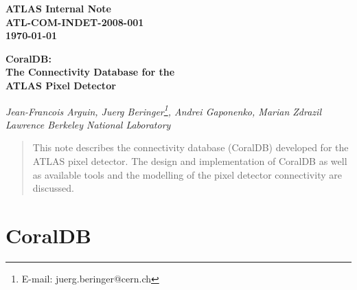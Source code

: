 \documentclass[12pt,twoside]{article}
\begin{document}
%
%
\begin{flushright} \large \bf
ATLAS Internal Note\\
ATL-COM-INDET-2008-001\\
\today
\end{flushright}

\vspace*{2cm}
\begin{center} \LARGE \bf
CoralDB:\\The Connectivity Database for the\\ATLAS Pixel Detector
\end{center}

\vspace*{0.2cm}
\begin{center} \it
Jean-Francois Arguin, Juerg Beringer\footnote{E-mail: juerg.beringer@cern.ch}, Andrei Gaponenko, Marian Zdrazil\\
Lawrence Berkeley National Laboratory\\
\vspace*{0.5cm}
\end{center}

\vspace*{0.5cm}
\begin{abstract} \noindent
This note describes the connectivity database (CoralDB) developed for the ATLAS pixel
detector. The design and implementation of CoralDB as well as available tools and the modelling
of the pixel detector connectivity are discussed.
\end{abstract}
\vspace*{0.5cm}


%
%
\newpage
{}
\thispagestyle{empty}
\setcounter{tocdepth}{3}
\tableofcontents
{}
\listoffigures
\listoftables
{}
\setcounter{page}{1}


%
%
\newpage

\clearpage
\section{CoralDB}

\clearpage

\clearpage

\clearpage

\clearpage

\end{document}
